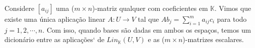     Considere $[a_{ij}]$ uma ($m\times{n}$)-matriz qualquer com coeficientes em $\mathbb{K}$. Vimos que existe uma
\'unica aplica\c c\~ao linear $A:U\rightarrow{V}$ tal que $Ab_j = \sum\limits_{i=1}^{m}a_{ij}c_i$ para todo $j = 1,
2, \cdots, n$. Com isso, quando bases s\~ao dadas em ambos os espa\c cos, temos um dicion\'ario entre as aplica\c c\~oes`
de $Lin_{\mathbb{K}}(U, V)$ e as ($m\times{n}$)-matrizes escalares.